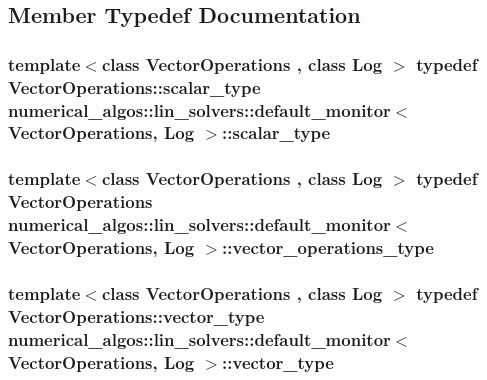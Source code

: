 \subsection{Member Typedef Documentation}
\hypertarget{classnumerical__algos_1_1lin__solvers_1_1default__monitor_a9c025ecb40da565f0f1584cbf2b10999}{
\subsubsection[{scalar\-\_\-type}]{\setlength{\rightskip}{0pt plus 5cm}template$<$class Vector\-Operations , class Log $>$ typedef Vector\-Operations\-::scalar\-\_\-type {\bf numerical\-\_\-algos\-::lin\-\_\-solvers\-::default\-\_\-monitor}$<$ Vector\-Operations, Log $>$\-::{\bf scalar\-\_\-type}}}\label{classnumerical__algos_1_1lin__solvers_1_1default__monitor_a9c025ecb40da565f0f1584cbf2b10999}
\hypertarget{classnumerical__algos_1_1lin__solvers_1_1default__monitor_a1353cb66ac3391ffaba236b3a860dc8e}{
\subsubsection[{vector\-\_\-operations\-\_\-type}]{\setlength{\rightskip}{0pt plus 5cm}template$<$class Vector\-Operations , class Log $>$ typedef Vector\-Operations {\bf numerical\-\_\-algos\-::lin\-\_\-solvers\-::default\-\_\-monitor}$<$ Vector\-Operations, Log $>$\-::{\bf vector\-\_\-operations\-\_\-type}}}\label{classnumerical__algos_1_1lin__solvers_1_1default__monitor_a1353cb66ac3391ffaba236b3a860dc8e}
\hypertarget{classnumerical__algos_1_1lin__solvers_1_1default__monitor_afe4ad299b536cf5df8efbd2c08b619f5}{
\subsubsection[{vector\-\_\-type}]{\setlength{\rightskip}{0pt plus 5cm}template$<$class Vector\-Operations , class Log $>$ typedef Vector\-Operations\-::vector\-\_\-type {\bf numerical\-\_\-algos\-::lin\-\_\-solvers\-::default\-\_\-monitor}$<$ Vector\-Operations, Log $>$\-::{\bf vector\-\_\-type}}}\label{classnumerical__algos_1_1lin__solvers_1_1default__monitor_afe4ad299b536cf5df8efbd2c08b619f5}



